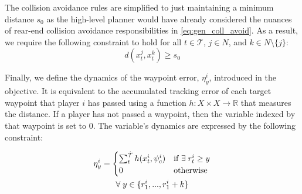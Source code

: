 The collision avoidance rules are simplified to just maintaining a minimum distance $s_0$ as the high-level planner would have already considered the nuances of rear-end collision avoidance responsibilities in \eqref{eq:gen_coll_avoid}. As a result, we require the following constraint to hold for all $t \in \mathcal{T}$, $j \in N$, and $k \in N \setminus \{j\}$:
\begin{equation} \label{eq:ll_coll_avoid}
    d(x^j_{t}, x^k_t) \geq s_0
\end{equation}

Finally, we define the dynamics of the waypoint error, $\eta^i_y$, introduced in the objective. It is equivalent to the accumulated tracking error of each target waypoint that player $i$ has passed using a function $h: X\times X \rightarrow \mathbb{R}$ that measures the distance. If a player has not passed a waypoint, then the variable indexed by that waypoint is set to 0. The variable's dynamics are expressed by the following constraint:

\begin{multline} \label{eq:ll_wp_err}
    \eta^i_y = \begin{cases} \sum_{t}^{\Hat{\mathcal{T}}} h(x^i_t, \psi^i_{c})  & \text{if } \exists \; r^i_t \geq y \\
    0 & \text{otherwise}
    \end{cases} \\ \forall \; y \in \{r^i_{1}, ..., r^i_{1} + k\}
\end{multline}

